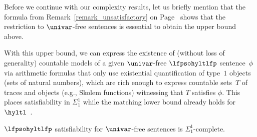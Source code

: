 Before we continue with our complexity results, let us briefly mention that the formula from Remark~\ref{remark_unsatisfactory} on Page~\pageref{remark_unsatisfactory} shows that the restriction to $\univar$-free sentences is essential to obtain the upper bound above.

With this upper bound, we can express the existence of (without loss of generality) countable models of a given $\univar$-free $\lfpsohyltlfp$ sentence~$\phi$ via arithmetic formulas that only use existential quantification of type~$1$ objects (sets of natural numbers), which are rich enough to express countable sets~$T$ of traces and objects (e.g., Skolem functions) witnessing that $T$ satisfies $\phi$.
This places satisfiability in $\Sigma_1^1$ while the matching lower bound already holds for $\hyltl$~\cite{hyperltlsatconf}.

\begin{thm}\label{thm_lfpsatcomplexity}
$\lfpsohyltlfp$ satisfiability for $\univar$-free sentences is $\Sigma_1^1$-complete.
\end{thm}


